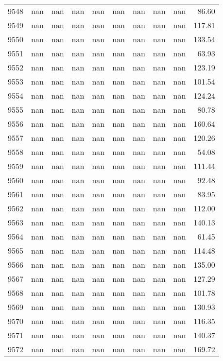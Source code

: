 \begin{tabular}{lrrrrrrrrr}
9548 & nan & nan & nan & nan & nan & nan & nan & nan & 86.60 \\
9549 & nan & nan & nan & nan & nan & nan & nan & nan & 117.81 \\
9550 & nan & nan & nan & nan & nan & nan & nan & nan & 133.54 \\
9551 & nan & nan & nan & nan & nan & nan & nan & nan & 63.93 \\
9552 & nan & nan & nan & nan & nan & nan & nan & nan & 123.19 \\
9553 & nan & nan & nan & nan & nan & nan & nan & nan & 101.54 \\
9554 & nan & nan & nan & nan & nan & nan & nan & nan & 124.24 \\
9555 & nan & nan & nan & nan & nan & nan & nan & nan & 80.78 \\
9556 & nan & nan & nan & nan & nan & nan & nan & nan & 160.64 \\
9557 & nan & nan & nan & nan & nan & nan & nan & nan & 120.26 \\
9558 & nan & nan & nan & nan & nan & nan & nan & nan & 54.08 \\
9559 & nan & nan & nan & nan & nan & nan & nan & nan & 111.44 \\
9560 & nan & nan & nan & nan & nan & nan & nan & nan & 92.48 \\
9561 & nan & nan & nan & nan & nan & nan & nan & nan & 83.95 \\
9562 & nan & nan & nan & nan & nan & nan & nan & nan & 112.00 \\
9563 & nan & nan & nan & nan & nan & nan & nan & nan & 140.13 \\
9564 & nan & nan & nan & nan & nan & nan & nan & nan & 61.45 \\
9565 & nan & nan & nan & nan & nan & nan & nan & nan & 114.48 \\
9566 & nan & nan & nan & nan & nan & nan & nan & nan & 135.00 \\
9567 & nan & nan & nan & nan & nan & nan & nan & nan & 127.29 \\
9568 & nan & nan & nan & nan & nan & nan & nan & nan & 101.78 \\
9569 & nan & nan & nan & nan & nan & nan & nan & nan & 130.93 \\
9570 & nan & nan & nan & nan & nan & nan & nan & nan & 116.35 \\
9571 & nan & nan & nan & nan & nan & nan & nan & nan & 140.37 \\
9572 & nan & nan & nan & nan & nan & nan & nan & nan & 169.72 \\

\end{tabular}
